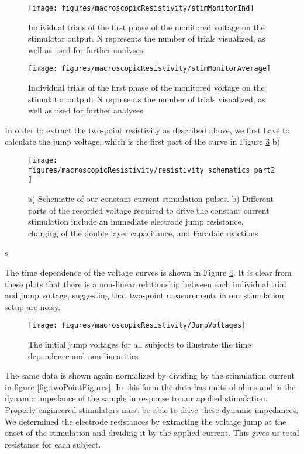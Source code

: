 	\begin{figure}[ht]
		\centering
		\texttt{[image: figures/macroscopicResistivity/stimMonitorInd]}
		\caption[Individual stimulation monitor output]{Individual trials of the first phase of the monitored voltage on the stimulator output. N represents the number of trials visualized, as well as used for further analyses}
		\label{fig:mrStimMonInd}
	\end{figure}
	

\begin{figure}[ht]
	\centering
	\texttt{[image: figures/macroscopicResistivity/stimMonitorAverage]}
	\caption[Average stimulation monitor output]{Individual trials of the first phase of the monitored voltage on the stimulator output. N represents the number of trials visualized, as well as used for further analyses}
	\label{fig:mrStimMonAverage}
\end{figure}

In order to extract the two-point resistivity as described above, we first have to calculate the jump voltage, which is the first part of the curve in Figure \ref{fig:mrStimSchem} b)

\begin{figure}[ht]
	\centering
	\texttt{[image: figures/macroscopicResistivity/resistivity\_schematics\_part2]}
	\caption[Constant current stimulation]{a) Schematic of our constant current stimulation pulses. b) Different parts of the recorded voltage required to drive the constant current stimulation include an immediate electrode jump resistance, charging of the double layer capacitance, and Faradaic reactions}
	\label{fig:mrStimSchem}
\end{figure}s

The time dependence of the voltage curves is shown in Figure \ref{fig:jumpvoltages}. It is clear from these plots that there is a non-linear relationship between each individual trial and jump voltage, suggesting that two-point measurements in our stimulation setup are noisy. 

\begin{figure}[ht]
	\centering
	\texttt{[image: figures/macroscopicResistivity/JumpVoltages]}
	\caption[Jump voltages over time all subjects]{The initial jump voltages for all subjects to illustrate the time dependence and non-linearities}
	\label{fig:jumpvoltages}
\end{figure}


The same data is shown again normalized by dividing by the stimulation current in figure \ref{fig:twoPointFigures}. In this form the data has units of ohms and is the dynamic impedance of the sample in response to our applied stimulation. Properly engineered stimulators must be able to drive these dynamic impedances. We determined the electrode resistances by extracting the voltage jump at the onset of the stimulation and dividing it by the applied current.
This gives us total resistance for each subject.

